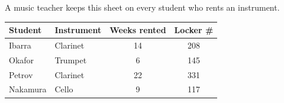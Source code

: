 \documentclass[12pt]{article}
\begin{document}

\vspace{0.26in}

\boxguard[20]
\begin{hookbox}
A music teacher keeps this sheet on every student who rents an instrument.

\vspace{10pt}
\begin{center}
\renewcommand{\arraystretch}{1.45}
\begin{tabular}{@{} l l c c @{}}
\rowcolor{sky}
\textbf{Student} & \textbf{Instrument} & \textbf{Weeks rented} & \textbf{Locker \#} \\
\hline
Ibarra   & Clarinet & 14 & 208 \\
Okafor   & Trumpet  &  6 & 145 \\
Petrov   & Clarinet & 22 & 331 \\
Nakamura & Cello    &  9 & 117 \\
\hline
\end{tabular}
\end{center}
\vspace{4pt}
\end{hookbox}

\vspace{0.30in}
\end{document}
